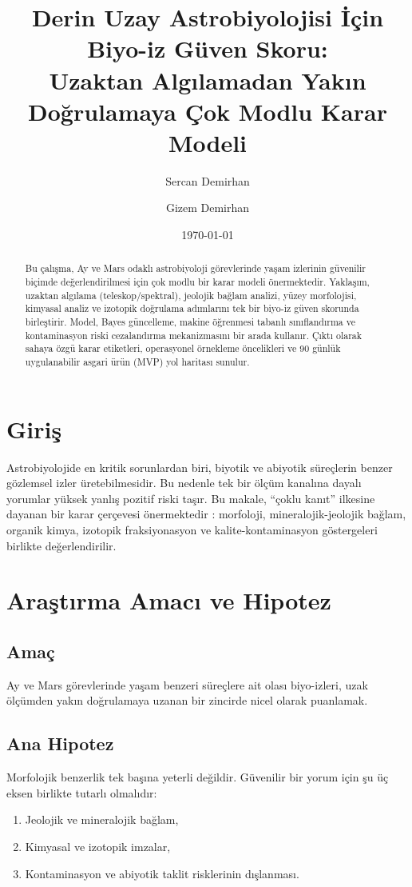 \documentclass[12pt,a4paper]{article}
\title{Derin Uzay Astrobiyolojisi İçin Biyo-iz Güven Skoru:\\
Uzaktan Algılamadan Yakın Doğrulamaya Çok Modlu Karar Modeli}
\author{Sercan Demirhan \and Gizem Demirhan}
\date{\today}
\begin{document}
\shorthandoff{=}
\maketitle

\begin{abstract}
Bu çalışma, Ay ve Mars odaklı astrobiyoloji görevlerinde yaşam izlerinin güvenilir biçimde değerlendirilmesi için çok modlu bir karar modeli önermektedir. Yaklaşım, uzaktan algılama (teleskop/spektral), jeolojik bağlam analizi, yüzey morfolojisi, kimyasal analiz ve izotopik doğrulama adımlarını tek bir biyo-iz güven skorunda birleştirir. Model, Bayes güncelleme, makine öğrenmesi tabanlı sınıflandırma ve kontaminasyon riski cezalandırma mekanizmasını bir arada kullanır. Çıktı olarak sahaya özgü karar etiketleri, operasyonel örnekleme öncelikleri ve 90 günlük uygulanabilir asgari ürün (MVP) yol haritası sunulur.
\end{abstract}

\section{Giriş}
Astrobiyolojide en kritik sorunlardan biri, biyotik ve abiyotik süreçlerin benzer gözlemsel izler üretebilmesidir. Bu nedenle tek bir ölçüm kanalına dayalı yorumlar yüksek yanlış pozitif riski taşır. Bu makale, ``çoklu kanıt'' ilkesine dayanan bir karar çerçevesi önermektedir \cite{allwood2006}: morfoloji, mineralojik-jeolojik bağlam, organik kimya, izotopik fraksiyonasyon \cite{schidlowski2001} ve kalite-kontaminasyon göstergeleri birlikte değerlendirilir.

\section{Araştırma Amacı ve Hipotez}
\subsection{Amaç}
Ay ve Mars görevlerinde yaşam benzeri süreçlere ait olası biyo-izleri, uzak ölçümden yakın doğrulamaya uzanan bir zincirde nicel olarak puanlamak.

\subsection{Ana Hipotez}
Morfolojik benzerlik tek başına yeterli değildir. Güvenilir bir yorum için şu üç eksen birlikte tutarlı olmalıdır:
\begin{enumerate}[label=\arabic*.]
    \item Jeolojik ve mineralojik bağlam,
    \item Kimyasal ve izotopik imzalar,
    \item Kontaminasyon ve abiyotik taklit risklerinin dışlanması.
\end{enumerate}
\end{document}
